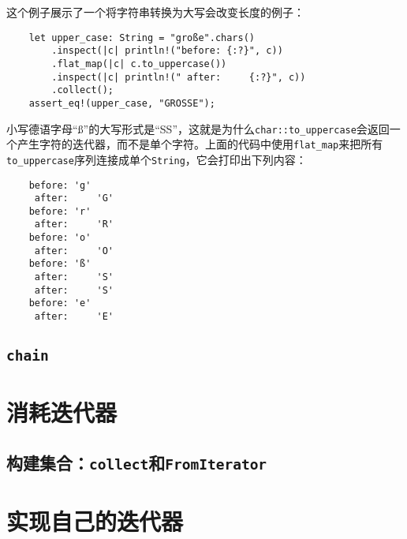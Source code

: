 这个例子展示了一个将字符串转换为大写会改变长度的例子：
\begin{verbatim}
    let upper_case: String = "große".chars()
        .inspect(|c| println!("before: {:?}", c))
        .flat_map(|c| c.to_uppercase())
        .inspect(|c| println!(" after:     {:?}", c))
        .collect();
    assert_eq!(upper_case, "GROSSE");
\end{verbatim}

小写德语字母“ß”的大写形式是“SS”，这就是为什么\texttt{char::to_uppercase}会返回一个产生字符的迭代器，而不是单个字符。上面的代码中使用\texttt{flat\_map}来把所有\texttt{to\_uppercase}序列连接成单个\texttt{String}，它会打印出下列内容：
\begin{verbatim}
    before: 'g'
     after:     'G'
    before: 'r'
     after:     'R'
    before: 'o'
     after:     'O'
    before: 'ß'
     after:     'S'
     after:     'S'
    before: 'e'
     after:     'E'
\end{verbatim}

\subsection{\texttt{chain}}


\section{消耗迭代器}

\subsection{构建集合：\texttt{collect}和\texttt{FromIterator}}\label{BuildColl}

\section{实现自己的迭代器}